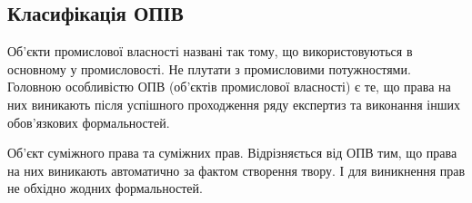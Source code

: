\subsection{Класифікація ОПІВ}

Об’єкти промислової власності названі так тому, що використовуються в основному у промисловості. Не плутати з промисловими потужностями. Головною особливістю ОПВ (об’єктів промислової власності) є те, що права на них виникають після успішного проходження ряду експертиз та виконання інших обов’язкових формальностей. 

Об’єкт суміжного права та суміжних прав. Відрізняється від ОПВ тим, що права на них виникають автоматично за фактом створення твору. І для виникнення прав не обхідно жодних формальностей.
